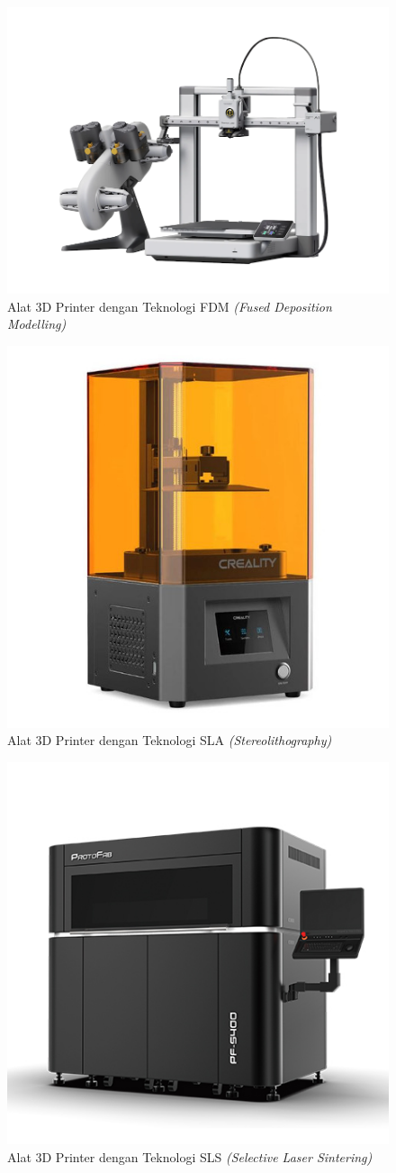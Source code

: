 \begin{figure}[H]
    \centering
    \includegraphics[width=0.35\linewidth]{gambar/fdm-3d-printer.png}
    \caption{Alat 3D Printer dengan Teknologi FDM \textit{(Fused Deposition Modelling)}}
    \label{fig:fdm-3d-printer}
\end{figure}

\begin{figure}[H]
    \centering
    \includegraphics[width=0.25\linewidth]{gambar/sla-3d-printer.jpg}
    \caption{Alat 3D Printer dengan Teknologi SLA \textit{(Stereolithography)}}
    \label{fig:sla-3d-printer}
\end{figure}

\begin{figure}[H]
    \centering
    \includegraphics[width=0.3\linewidth]{gambar/sls-3d-printer.jpg}
    \caption{Alat 3D Printer dengan Teknologi SLS \textit{(Selective Laser Sintering)}}
    \label{fig:sls-3d-printer}
\end{figure}

